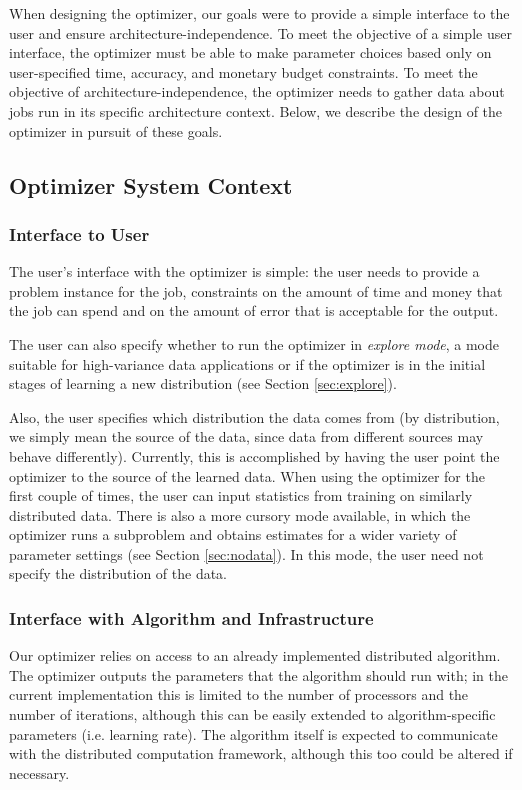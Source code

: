 
When designing the optimizer, our goals were to provide a simple 
interface to the user and ensure architecture-independence. To meet the
objective of a simple user interface, the optimizer must be able to
make parameter choices based only on user-specified time, accuracy, and
monetary budget constraints. To meet
the objective of architecture-independence, the optimizer needs to gather
data about jobs run in its specific architecture context. Below,
we describe the design of the optimizer in pursuit of these goals. 

\subsection{Optimizer System Context}


\subsubsection{Interface to User}
The user's interface with the optimizer is simple: the user needs to
provide a problem instance for the job, constraints on the amount of
time and money that the job can spend and on the amount of error
that is acceptable for the output. 

The user can also specify whether to run the optimizer in {\em explore 
mode}, a mode suitable for high-variance data applications or if the 
optimizer is in the initial stages of learning a new 
distribution (see Section \ref{sec:explore}). 

Also, the user specifies which distribution the data comes from (by
distribution, we simply mean the source of the data, since data from
different sources may behave differently). Currently,
this is accomplished by having the user point the optimizer to the 
source of the learned data. When using the optimizer for the first 
couple of times, the user can input statistics from training on similarly
distributed data. There is also a more cursory mode available, in which
the optimizer runs a subproblem and obtains estimates for a wider 
variety of parameter settings (see Section \ref{sec:nodata}). In this 
mode, the user need not specify the distribution of the data. 

\subsubsection{Interface with Algorithm and Infrastructure}
Our optimizer relies on access to an already implemented distributed 
algorithm. The optimizer outputs the parameters that the algorithm 
should run with; in the current implementation this is limited to 
the number of processors and the number of iterations, although this
can be easily extended to algorithm-specific parameters (i.e. learning
rate). 
The algorithm itself is expected to communicate with the distributed
computation framework, although this too could be altered if necessary.

